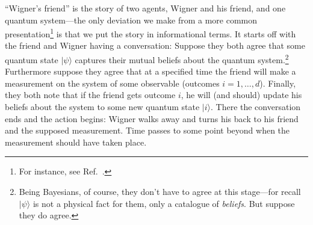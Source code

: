 \documentclass[aps,pra,superscriptaddress,12pt,tightenlines,nofootinbib]{revtex4-2}
\begin{document}
``Wigner's friend'' is the story of two agents, Wigner and his friend, and one quantum system---the only deviation we make from a more common presentation\footnote{For instance, see Ref.\ \cite{Albert94}.} is that we put the story in informational terms.  It starts off with the friend and Wigner having a conversation:  Suppose they both agree that some quantum state $|\psi\rangle$ captures their mutual beliefs about the quantum system.\footnote{Being Bayesians, of course, they don't have to agree at this stage---for recall $|\psi\rangle$ is not a physical fact for them, only a catalogue of {\it beliefs}.  But suppose they do agree.} Furthermore suppose they agree that at a specified time the friend will make a measurement on the system of some observable (outcomes $i=1,\ldots,d$).  Finally, they both note that if the friend gets outcome $i$, he will (and should) update his beliefs about the system to some new quantum state $|i\rangle$.  There the conversation ends and the action begins:  Wigner walks away and turns his back to his friend and the supposed measurement.  Time passes to some point beyond when the measurement should have taken place.
\end{document}
